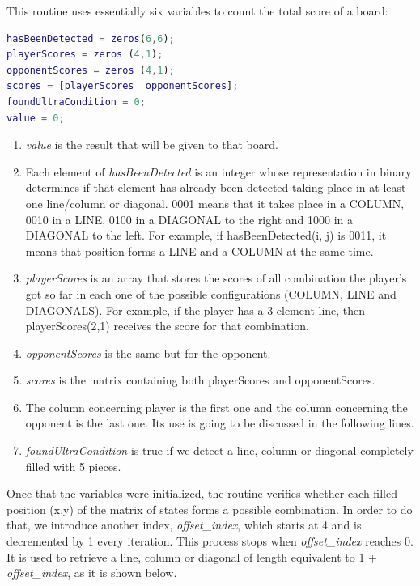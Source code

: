\vspace{10pt}

This routine uses essentially six variables to count the total score of a
board:
 
 \vspace{10pt}

\begin{lstlisting}[language=Matlab]
hasBeenDetected = zeros(6,6);
playerScores = zeros (4,1);
opponentScores = zeros (4,1);
scores = [playerScores  opponentScores];
foundUltraCondition = 0;
value = 0;
\end{lstlisting}

\begin{enumerate}
  	\item \textit{value} is the result that will be given to that board.
	\item Each element of \textit{hasBeenDetected} is an integer whose
	representation in binary determines if that element has already been detected
	taking place in at least one line/column or diagonal. 0001 means that it takes
	place in a COLUMN, 0010 in a LINE, 0100 in a DIAGONAL to the right and 1000 in
	a DIAGONAL to the left. For example, if hasBeenDetected(i, j) is 0011, it
	means that position forms a LINE and a COLUMN at the same time.
	\item \textit{playerScores} is an array that stores the scores of all
	combination the player’s got so far in each one of the possible configurations (COLUMN, LINE and DIAGONALS). For example, if the player has a 3-element line, then playerScores(2,1) receives the score for that combination.
	\item \textit{opponentScores} is the same but for the opponent.
	\item \textit{scores} is the matrix containing both playerScores and
	opponentScores.
	\item The column concerning player is the first one and the column concerning
	the opponent is the last one. Its use is going to be discussed in the following
	lines.
	\item \textit{foundUltraCondition} is true if we detect a line, column or
	diagonal completely filled with 5 pieces.
\end{enumerate} 

Once that the variables were initialized, the routine verifies whether each
filled position (x,y) of the matrix of states forms a possible combination.
In order to do that, we introduce another index, \textit{offset\_index}, which
starts at 4 and is decremented by 1 every iteration. This process stops when
\textit{offset\_index} reaches 0.  It is used to retrieve a line, column or
diagonal of length equivalent to 1 + \textit{offset\_index}, as it is shown
below.

